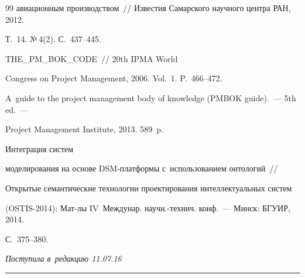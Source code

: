 {{\begin{thebibliography}{99}
авиационным производством~/\!\!/ Известия Самарского научного центра РАН, 2012. 


Т.~14. №\,4(2). С.~437--445.




 THE\_PM\_BOK\_CODE~/\!\!/ 20th IPMA World 


Congress on Project Management, 2006. Vol.~1. P.~466--472.




A~guide to the project management body of knowledge (PMBOK guide).~--- 5th ed.~--- 


Project Management Institute, 2013. 589~p.




 Интеграция систем 


моделирования на основе DSM-плат\-фор\-мы с~использованием онтологий~/\!\!/ 


Открытые семантические технологии проектирования интеллектуальных сис\-тем 


(OSTIS-2014): Мат-лы IV~Междунар. научн.-технич. конф.~--- Минск: БГУИР, 2014. 


С.~375--380.


       \end{thebibliography}


} }








\vspace*{-3pt}





\hfill{\small\textit{Поступила в~редакцию 11.07.16}}














\vspace*{9pt}





\hrule










\vspace*{2pt}





